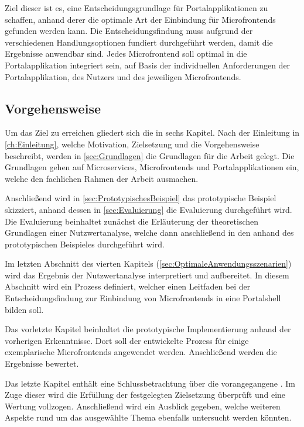 Ziel dieser \dokumententyp{} ist es, eine Entscheidungsgrundlage für Portalapplikationen zu schaffen, anhand derer die optimale Art der Einbindung für Microfrontends gefunden werden kann. 
Die Entscheidungsfindung muss aufgrund der verschiedenen Handlungsoptionen fundiert durchgeführt werden, damit die Ergebnisse anwendbar sind. 
Jedes Microfrontend soll optimal in die Portalapplikation integriert sein, auf Basis der individuellen Anforderungen der Portalapplikation, des Nutzers und des jeweiligen Microfrontends.

\subsection{Vorgehensweise}\label{sec:Vorgehensweise}

Um das Ziel zu erreichen gliedert sich die \dokumententyp{} in sechs Kapitel. Nach der Einleitung in \cref{ch:Einleitung}, welche Motivation, Zielsetzung und die Vorgehensweise beschreibt, werden in \cref{sec:Grundlagen} die Grundlagen für die Arbeit gelegt. Die Grundlagen gehen auf Microservices, Microfrontends und Portalapplikationen ein, welche den fachlichen Rahmen der Arbeit ausmachen.

Anschließend wird in \cref{sec:PrototypischesBeispiel} das prototypische Beispiel skizziert, anhand dessen in \cref{sec:Evaluierung} die Evaluierung durchgeführt wird. Die Evaluierung beinhaltet zunächst die Erläuterung der theoretischen Grundlagen einer Nutzwertanalyse, welche dann anschließend in den  anhand des prototypischen Beispieles durchgeführt wird. 

Im letzten Abschnitt des vierten Kapitels (\ref{sec:OptimaleAnwendungsszenarien}) wird das Ergebnis der Nutzwertanalyse interpretiert und aufbereitet. In diesem Abschnitt wird ein Prozess definiert, welcher einen Leitfaden bei der Entscheidungsfindung zur Einbindung von Microfrontends in eine Portalshell bilden soll.

Das vorletzte Kapitel beinhaltet die prototypische Implementierung anhand der vorherigen Erkenntnisse. Dort soll der entwickelte Prozess für einige exemplarische Microfrontends angewendet werden. Anschließend werden die Ergebnisse bewertet.

Das letzte Kapitel enthält eine Schlussbetrachtung über die vorangegangene \dokumententyp{}. Im Zuge dieser wird die Erfüllung der festgelegten Zielsetzung überprüft und eine Wertung vollzogen. Anschließend wird ein Ausblick gegeben, welche weiteren Aspekte rund um das ausgewählte Thema ebenfalls untersucht werden könnten.